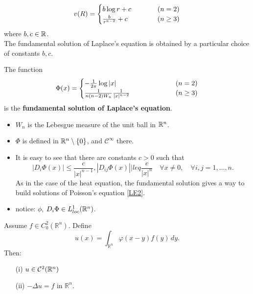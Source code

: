 \[
v(R) =\begin{cases}
    b \log r + c \hspace{1 cm} & (n=2)\\
    \frac{b}{r^{n-2}} + c \hspace{1 cm} & (n\geq 3)
\end{cases}
\]
where $b,c \in \mathbb{R}$.\\
The fundamental solution of Laplace's equation is obtained by a particular choice of constants $b,c$.
\begin{DefBox}
    \begin{Def}
        The function
        \begin{equation*}
            \Phi (x) = \begin{cases}
                - \frac{1}{2\pi} \log|x|  \hspace{2 cm} & (n=2) \\
                 \frac{1}{n(n-2)W_n} \frac{1}{|x|^{n-2}}  \hspace{2 cm} & (n\geq 3) 
            \end{cases}
        \end{equation*}
        is the \textbf{fundamental solution of Laplace's equation}.
    \end{Def}
\end{DefBox}
\begin{itemize}
    \item $W_n$ is the Lebesgue measure of the unit ball in $\mathbb{R}^n$.
    \item $\Phi$ is defined in $\mathbb{R}^n \setminus \{0\}$, and $\mathcal{C}^\infty$ there.
    \item It is easy to see that there are constants $c > 0$ such that
    \begin{equation*}
        |D_i \Phi(x)| \leq \frac{c}{|x|^{n-1}}, |D_{ij} \Phi(x)| |leq \frac{c}{|x|^n} \quad \forall x \neq 0, \quad \forall i,j = 1,\ldots,n.
    \end{equation*}
    As in the case of the heat equation, the fundamental solution gives a way to build solutions of Poisson's equation \eqref{LE2}.
    \item notice: $\phi$, $D_i\Phi \in L^1_{loc}(\mathbb{R}^n)$.
\end{itemize}

\begin{ThBox}
    \begin{Th}
Assume $f \in C_0^2(\mathbb{R}^n)$. Define
\[
u (x) = \int_{\mathbb{R}^n} \varphi(x-y)f(y) \, dy.
\]
Then:
\begin{itemize}
    \item[(i)] $u \in \mathcal{C}^2(\mathbb{R}^n)$
    \item[(ii)] $-\Delta u = f$ in $\mathbb{R}^n$.
\end{itemize}
\end{Th}
\end{ThBox}


